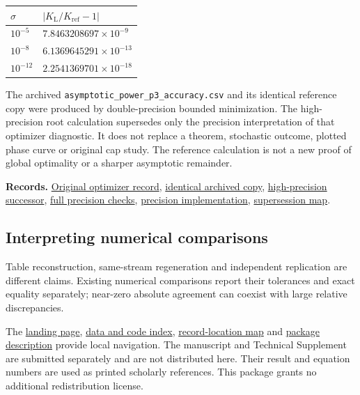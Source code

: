 \documentclass[11pt,a4paper]{article}
\begin{document}
\begin{longtable}[]{@{}ll@{}}
\toprule\noalign{}
\(\sigma\) & \(|K_{\mathrm{L}}/K_{\mathrm{ref}}-1|\) \\
\midrule\noalign{}
\endhead
\bottomrule\noalign{}
\endlastfoot
\(10^{-5}\) & \(7.8463208697\times10^{-9}\) \\
\(10^{-8}\) & \(6.1369645291\times10^{-13}\) \\
\(10^{-12}\) & \(2.2541369701\times10^{-18}\) \\
\end{longtable}

The archived \texttt{asymptotic\_power\_p3\_accuracy.csv} and its
identical reference copy were produced by double-precision bounded
minimization. The high-precision root calculation supersedes only the
precision interpretation of that optimizer diagnostic. It does not
replace a theorem, stochastic outcome, plotted phase curve or original
cap study. The reference calculation is not a new proof of global
optimality or a sharper asymptotic remainder.

\textbf{Records.}
\href{../data/records/asymptotic_power_p3_accuracy.csv}{Original
optimizer record},
\href{../data/targeted_reference/power/historical_power_p3_accuracy.csv}{identical
archived copy},
\href{../data/targeted_reference/power/power_p3_successor.csv}{high-precision
successor},
\href{../data/targeted_reference/power/power_reference.json}{full
precision checks}, \href{../targeted/power_reference.py}{precision
implementation}, \href{../config/supersession.json}{supersession map}.

\subsection{Interpreting numerical
comparisons}\label{c09-interpretation}

Table reconstruction, same-stream regeneration and independent
replication are different claims. Existing numerical comparisons report
their tolerances and exact equality separately; near-zero absolute
agreement can coexist with large relative discrepancies.

The \href{../index.html}{landing page}, \href{DATA_INDEX.md}{data and
code index}, \href{RECORD_LOCATIONS.md}{record-location map} and
\href{../config/package_info.json}{package description} provide local
navigation. The manuscript and Technical Supplement are submitted
separately and are not distributed here. Their result and equation
numbers are used as printed scholarly references. This package grants no
additional redistribution license.
\end{document}

